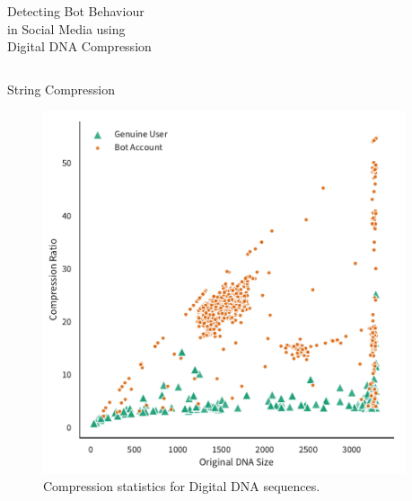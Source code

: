 \documentclass[presentation,17pt]{beamer}
\begin{document}
\begin{frame}{Detecting Bot Behaviour \\ in Social Media using \\ Digital DNA Compression}
\begin{columns}[t]
\begin{column}{0.48\textwidth}
\begin{block}{String Compression}
        \begin{figure}
          \caption{Compression statistics for Digital DNA sequences.}
          \includegraphics[width=0.7\linewidth]{dna-scatter-2.pdf}
        \end{figure}
        
      \end{block}
    \end{column}

    \begin{column}{0.04\textwidth}
    \end{column}


\end{columns}
\end{frame}
\end{document}
